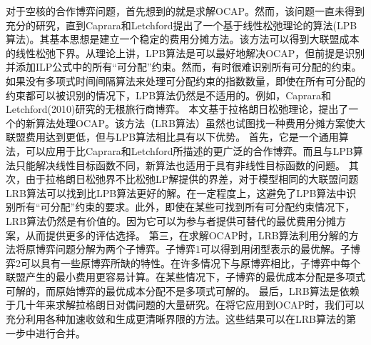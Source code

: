 \documentclass[UTF8]{article}
\begin{document}
对于空核的合作博弈问题，首先想到的就是求解OCAP。然而，该问题一直未得到充分的研究，直到Caprara和Letchford提出了一个基于线性松弛理论的算法(LPB算法)。其基本思想是建立一个稳定的费用分摊方法。该方法可以得到大联盟成本的线性松弛下界。从理论上讲，LPB算法是可以最好地解决OCAP，但前提是识别并添加ILP公式中的所有“可分配”约束。然而，有时很难识别所有可分配的约束。如果没有多项式时间间隔算法来处理可分配约束的指数数量，即使在所有可分配的约束都可以被识别的情况下，LPB算法仍然是不适用的。例如，Caprara和Letchford(2010)研究的无根旅行商博弈。
本文基于拉格朗日松弛理论，提出了一个的新算法处理OCAP。该方法（LRB算法）虽然也试图找一种费用分摊方案使大联盟费用达到更低，但与LPB算法相比具有以下优势。
首先，它是一个通用算法，可以应用于比Caprara和Letchford所描述的更广泛的合作博弈。而且与LPB算法只能解决线性目标函数不同，新算法也适用于具有非线性目标函数的问题。
其次，由于拉格朗日松弛界不比松弛LP解提供的界差，对于模型相同的大联盟问题LRB算法可以找到比LPB算法更好的解。在一定程度上，这避免了LPB算法中识别所有“可分配”约束的要求。此外，即使在某些可找到所有可分配约束情况下，LRB算法仍然是有价值的。因为它可以为参与者提供可替代的最优费用分摊方案，从而提供更多的评估选择。
第三，在求解OCAP时，LRB算法利用分解的方法将原博弈问题分解为两个子博弈。子博弈1可以得到用闭型表示的最优解。子博弈2可以具有一些原博弈所缺的特性。在许多情况下与原博弈相比，子博弈中每个联盟产生的最小费用更容易计算。在某些情况下，子博弈的最优成本分配是多项式可解的，而原始博弈的最优成本分配不是多项式可解的。
最后，LRB算法是依赖于几十年来求解拉格朗日对偶问题的大量研究。在将它应用到OCAP时，我们可以充分利用各种加速收敛和生成更清晰界限的方法。这些结果可以在LRB算法的第一步中进行合并。
\end{document}
